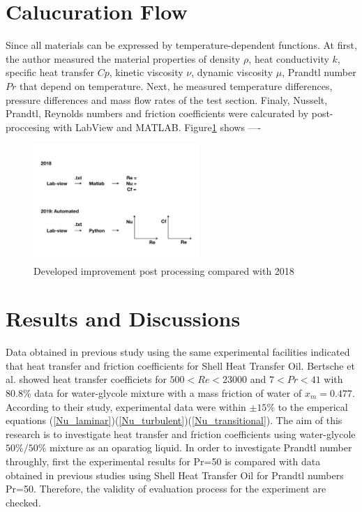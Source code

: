 \documentclass[conference]{IEEEtran}
\begin{document}
\section{Calucuration Flow}
Since all materials can be expressed by temperature-dependent functions.
At first, the author measured the material properties of density $\rho$,  heat conductivity $k$, specific heat transfer $Cp$, kinetic viscosity $\nu$, dynamic viscosity $\mu$, Prandtl number $Pr$ that depend on temperature.
Next, he measured temperature differences, pressure differences and mass flow rates of the test section.
Finaly, Nusselt, Prandtl, Reynolds numbers and friction coefficients were calcurated by post-proccesing with LabView and MATLAB.
Figure\ref{post_processing} shows ----
\begin{figure}[htbp]
  \centering
  \vspace{-6zh}
  \includegraphics[width=0.56\textwidth, natwidth=920,natheight=720]{fig/post_processing.pdf}
  \vspace{-3zh}
  \caption{Developed improvement post processing compared with 2018}
  \label{post_processing}
\end{figure}

\newpage
\newpage
\section{Results and Discussions}
Data obtained in previous study\cite{Christphan2018} using the same experimental facilities indicated that heat transfer and friction coefficients for Shell Heat Transfer Oil.
Bertsche et al.\cite{Bertsche2016} showed heat transfer coefficiets for $500 < Re < 23000$ and $7 < Pr < 41$ with $80.8\%$ data for water-glycole mixture with a mass friction of water of $x_{m} = 0.477$.
According to their study, experimental data were within $\pm15\%$ to the emperical equations (\ref{Nu_laminar})(\ref{Nu_turbulent})(\ref{Nu_transitional}).
The aim of this research is to investigate heat transfer and friction coefficients using  water-glycole $50\%/50\%$ mixture as an oparatiog liquid.
In order to investigate Prandtl number throughly, first the experimental results for Pr=50 is compared with data obtained in previous studies \cite{Christphan2018} using Shell Heat Transfer Oil for Prandtl numbers Pr=50.
Therefore, the validity of evaluation process for the experiment are checked.\\
\end{document}
